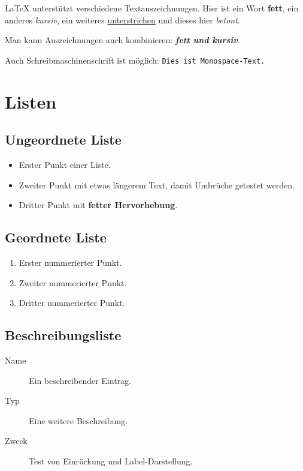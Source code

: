 \documentclass[a4paper,12pt]{article}
\begin{document}
	LaTeX unterstützt verschiedene Textauszeichnungen. Hier ist ein Wort
	\textbf{fett}, ein anderes \textit{kursiv}, ein weiteres \underline{unterstrichen}
	und dieses hier \emph{betont}.

	Man kann Auszeichnungen auch kombinieren:
	\textbf{\textit{fett und kursiv}}.

	Auch Schreibmaschinenschrift ist möglich:
	\texttt{Dies ist Monospace-Text.}

	\section{Listen}

	\subsection{Ungeordnete Liste}

	\begin{itemize}
		\item Erster Punkt einer Liste.
		\item Zweiter Punkt mit etwas längerem Text, damit Umbrüche getestet werden.
		\item Dritter Punkt mit \textbf{fetter Hervorhebung}.
	\end{itemize}

	\subsection{Geordnete Liste}

	\begin{enumerate}
		\item Erster nummerierter Punkt.
		\item Zweiter nummerierter Punkt.
		\item Dritter nummerierter Punkt.
	\end{enumerate}

	\subsection{Beschreibungsliste}

	\begin{description}
		\item[Name] Ein beschreibender Eintrag.
		\item[Typ] Eine weitere Beschreibung.
		\item[Zweck] Test von Einrückung und Label-Darstellung.
	\end{description}
\end{document}
